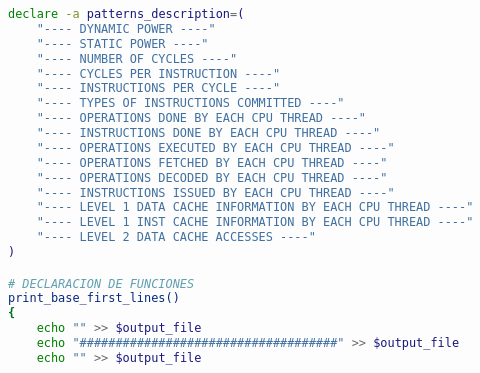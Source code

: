 \begin{lstlisting}[language=bash,caption={Programa de filtrado de estadísticas de Gem5},label=lst:getStats, showstringspaces=false,frame=single]
declare -a patterns_description=(
    "---- DYNAMIC POWER ----"
    "---- STATIC POWER ----"
    "---- NUMBER OF CYCLES ----"
    "---- CYCLES PER INSTRUCTION ----"
    "---- INSTRUCTIONS PER CYCLE ----"
    "---- TYPES OF INSTRUCTIONS COMMITTED ----"
    "---- OPERATIONS DONE BY EACH CPU THREAD ----"
    "---- INSTRUCTIONS DONE BY EACH CPU THREAD ----"
    "---- OPERATIONS EXECUTED BY EACH CPU THREAD ----" 
    "---- OPERATIONS FETCHED BY EACH CPU THREAD ----"
    "---- OPERATIONS DECODED BY EACH CPU THREAD ----"
    "---- INSTRUCTIONS ISSUED BY EACH CPU THREAD ----"
    "---- LEVEL 1 DATA CACHE INFORMATION BY EACH CPU THREAD ----"
    "---- LEVEL 1 INST CACHE INFORMATION BY EACH CPU THREAD ----"
    "---- LEVEL 2 DATA CACHE ACCESSES ----"
)

# DECLARACION DE FUNCIONES
print_base_first_lines()
{
    echo "" >> $output_file
    echo "####################################" >> $output_file
    echo "" >> $output_file
    

\end{lstlisting}
